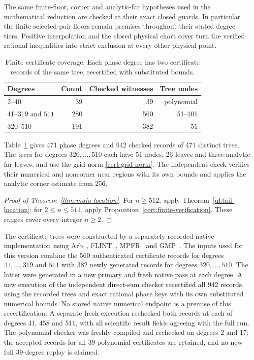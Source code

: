 The same finite-floor, corner and analytic-far hypotheses used in the
mathematical reduction are checked at their exact closed guards.
In particular the finite selected-pair floors remain premises throughout
their stated degree tiers. Positive interpolation and the closed physical
chart cover turn the verified rational inequalities into strict exclusion
at every other physical point.

\begin{table}[htbp]
\centering\small
\caption{Finite certificate coverage. Each phase degree has two certificate
records of the same tree, recertified with substituted bounds.}
\label{cert:coverage}
\begin{tabular}{@{}lrrr@{}}
\toprule
Degrees & Count & Checked witnesses & Tree nodes\\
\midrule
2--40 &39&39& polynomial\\
41--319 and $511$ &280&560&51--101\\
320--510 &191&382&$51$\\
\bottomrule
\end{tabular}
\end{table}

Table~\ref{cert:coverage} gives 471 phase degrees and 942 checked records
of 471 distinct trees.
The trees for degrees $320,\ldots,510$ each have 51 nodes, 26 leaves
and three analytic far leaves, and use the grid norm \eqref{cert:grid-norm}. The independent
check verifies their numerical and noncorner near regions with its own
bounds and applies the analytic corner estimate from 256.
\begin{proof}[Proof of Theorem~\ref{thm:main-location}]
For $n\geq512$, apply Theorem~\ref{ul:tail-location}; for
$2\leq n\leq511$, apply Proposition~\ref{cert:finite-verification}.
These ranges cover every integer $n\geq2$.
\end{proof}

The certificate trees were constructed by a separately recorded native
implementation using Arb~\cite{Johansson2017Arb}, FLINT~\cite{FLINT},
MPFR~\cite{Fousse2007MPFR} and GMP~\cite{GMP}.
The inputs used for this version combine the 560 authenticated certificate
records for degrees $41,\ldots,319$ and $511$ with 382 newly generated
records for degrees $320,\ldots,510$. The latter were generated in a new
primary and fresh native pass at each degree.
A new execution of the independent direct-sum checker recertified all
942 records, using the recorded trees and exact rational phase keys with
its own substituted numerical bounds. No stored native numerical endpoint
is a premise of this recertification. A separate fresh execution rechecked
both records at each of degrees 41, 458 and 511, with all scientific
result fields agreeing with the full run.
The polynomial checker was freshly compiled and rechecked on degrees
2 and 17; the accepted records for all 39 polynomial certificates are
retained, and no new full 39-degree replay is claimed.

